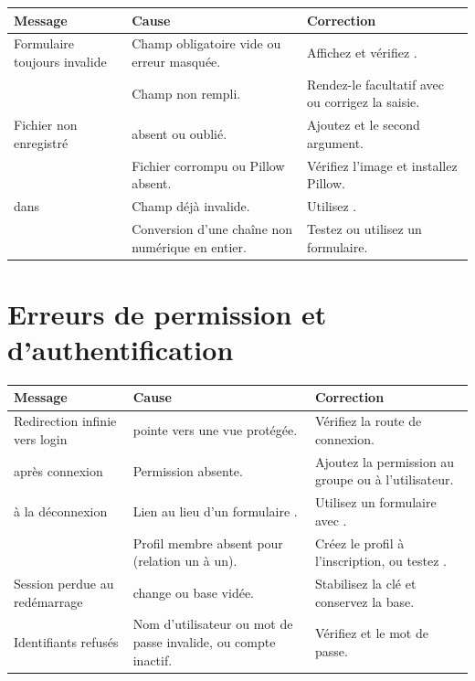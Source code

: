 \begin{longtable}{L{5.2cm} L{4.5cm} L{4.7cm}}
\toprule
\textbf{Message} & \textbf{Cause} & \textbf{Correction} \\
\midrule
\endhead
\footnotesize
Formulaire toujours invalide & Champ obligatoire vide ou erreur masquée. &
Affichez  et vérifiez . \\
 & Champ non rempli. & Rendez-le facultatif avec
 ou corrigez la saisie. \\
Fichier non enregistré &  absent ou  oublié. &
Ajoutez  et le second argument. \\
 & Fichier corrompu ou Pillow absent. & Vérifiez
l'image et installez Pillow. \\
 dans  & Champ déjà invalide. & Utilisez
. \\
 & Conversion d'une chaîne non numérique en entier. & Testez  ou utilisez un formulaire. \\
\bottomrule
\end{longtable}

\section{Erreurs de permission et d'authentification}

\begin{longtable}{L{5.2cm} L{4.5cm} L{4.7cm}}
\toprule
\textbf{Message} & \textbf{Cause} & \textbf{Correction} \\
\midrule
\endhead
\footnotesize
Redirection infinie vers login &  pointe vers une vue protégée. &
Vérifiez la route de connexion. \\
 après connexion & Permission absente. & Ajoutez la permission
au groupe ou à l'utilisateur. \\
 à la déconnexion & Lien au lieu d'un formulaire . & Utilisez
un formulaire avec . \\
 & Profil membre absent pour
 (relation un à un). & Créez le profil
à l'inscription, ou testez . \\
Session perdue au redémarrage &  change ou base vidée. &
Stabilisez la clé et conservez la base. \\
Identifiants refusés & Nom d'utilisateur ou mot de passe invalide, ou
compte inactif. & Vérifiez  et le mot de passe. \\
\bottomrule
\end{longtable}

